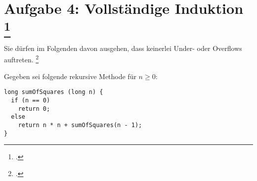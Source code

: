 \documentclass{lehramt-informatik-aufgabe}
\begin{document}
\let\m=\liInduktionMarkierung
\let\e=\liInduktionErklaerung


\section{Aufgabe 4: Vollständige Induktion
\footcite{sosy:ab:8}
}

Sie dürfen im Folgenden davon ausgehen, dass keinerlei Under- oder
Overflows auftreten.
\footcite[Thema 1 Aufgabe 4]{examen:66115:2017:03}

\bigskip

\noindent
Gegeben sei folgende rekursive Methode für $n \geq 0$:

\begin{verbatim}
long sumOfSquares (long n) {
  if (n == 0)
    return 0;
  else
    return n * n + sumOfSquares(n - 1);
}
\end{verbatim}
\end{document}
